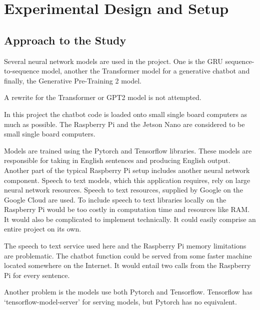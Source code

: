 \chapter{Experimental Design and Setup}

\label{chapter-approach-to-study}

\section{Approach to the Study}

Several neural network models are used in the project. One is the GRU sequence-to-sequence model, another the Transformer model for a generative chatbot and finally, the Generative Pre-Training 2 model.

A rewrite for the Transformer or GPT2 model is not attempted.

In this project the chatbot code is loaded onto small single board computers as much as possible. The Raspberry Pi and the Jetson Nano are considered to be small single board computers.

Models are trained using the Pytorch and Tensorflow libraries. These models are responsible for taking in English sentences and producing English output. Another part of the typical Raspberry Pi setup includes another neural network component. Speech to text models, which this application requires, rely on large neural network resources. Speech to text resources, supplied by Google on the Google Cloud are used. To include speech to text libraries locally on the Raspberry Pi would be too costly in computation time and resources like RAM. It would also be complicated to implement technically. It could easily comprise an entire project on its own.


The speech to text service used here and the Raspberry Pi memory limitations are problematic. The chatbot function could be served from some faster machine located somewhere on the Internet. It would entail two calls from the Raspberry Pi for every sentence.%

Another problem is the models use both Pytorch and Tensorflow. Tensorflow has `tensorflow-model-server' for serving models, but Pytorch has no equivalent. %


